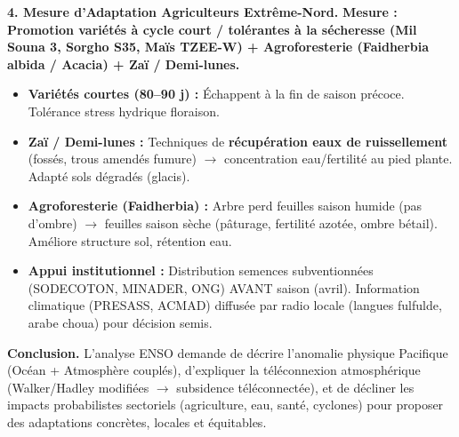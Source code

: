 \documentclass[11pt]{article}
\begin{document}
\begin{exoresolu}
\textbf{4. Mesure d'Adaptation Agriculteurs Extrême-Nord.}
\textbf{Mesure :} \textbf{Promotion variétés à cycle court / tolérantes à la sécheresse (Mil Souna 3, Sorgho S35, Maïs TZEE-W) + Agroforesterie (Faidherbia albida / Acacia) + Zaï / Demi-lunes.}
\begin{itemize}
    \item \textbf{Variétés courtes (80--90 j) :} Échappent à la fin de saison précoce. Tolérance stress hydrique floraison.
    \item \textbf{Zaï / Demi-lunes :} Techniques de \textbf{récupération eaux de ruissellement} (fossés, trous amendés fumure) $\to$ concentration eau/fertilité au pied plante. Adapté sols dégradés (glacis).
    \item \textbf{Agroforesterie (Faidherbia) :} Arbre perd feuilles saison humide (pas d'ombre) $\to$ feuilles saison sèche (pâturage, fertilité azotée, ombre bétail). Améliore structure sol, rétention eau.
    \item \textbf{Appui institutionnel :} Distribution semences subventionnées (SODECOTON, MINADER, ONG) AVANT saison (avril). Information climatique (PRESASS, ACMAD) diffusée par radio locale (langues fulfulde, arabe choua) pour décision semis.
\end{itemize}

\textbf{Conclusion.} L'analyse ENSO demande de décrire l'anomalie physique Pacifique (Océan + Atmosphère couplés), d'expliquer la téléconnexion atmosphérique (Walker/Hadley modifiées $\to$ subsidence téléconnectée), et de décliner les impacts probabilistes sectoriels (agriculture, eau, santé, cyclones) pour proposer des adaptations concrètes, locales et équitables.
\end{exoresolu}

\end{document}
